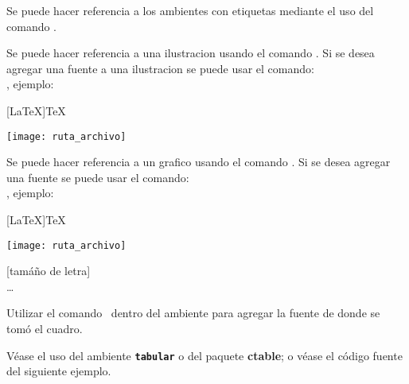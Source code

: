 
Se puede hacer referencia a los ambientes con etiquetas mediante el uso del comando \pa[etiqueta].


Se puede hacer referencia a una ilustracion usando el comando .
Si se desea agregar una fuente a una ilustracion se puede usar el comando: \\ , ejemplo:

\begin{listado}{[LaTeX]TeX}
  \begin{ilustracion}
      \texttt{[image: ruta\_archivo]}
  \end{ilustracion}
\end{listado}



Se puede hacer referencia a un grafico usando el comando .
Si se desea agregar una fuente se puede usar el comando: \\ , ejemplo:

\begin{listado}{[LaTeX]TeX}
  \begin{grafico}
      \texttt{[image: ruta\_archivo]}
  \end{grafico}
\end{listado}


{[tamáño de letra]\\\pa[etiqueta]\pa[columnas]}{\ldots}

Utilizar el comando \pa[fuente]\ dentro del ambiente para agregar la fuente de donde se tomó el cuadro.

Véase el uso del ambiente \texttt{\textbf{tabular}} o del paquete \textbf{ctable}; o véase el código fuente del siguiente ejemplo.


